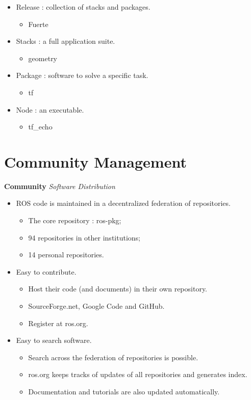 \documentclass[a4paper, 10pt, conference]{ieeeconf}       %
\begin{document}
\begin{itemize}
  \item Release : collection of stacks and packages.
  \begin{itemize}
    \item Fuerte
  \end{itemize}
  \item Stacks : a full application suite.
  \begin{itemize}
    \item geometry
  \end{itemize}
  \item Package : software to solve a specific task.
  \begin{itemize}
    \item tf
  \end{itemize}
  \item Node : an executable.
  \begin{itemize}
    \item tf\_echo
  \end{itemize}
\end{itemize}



\section{Community Management}

\textbf{Community}
\textit{Software Distribution}

\begin{itemize}
  \item ROS code is maintained in a decentralized federation of repositories.
  \begin{itemize}
    \item The core repository : ros-pkg;
    \item 94 repositories in other institutions;
    \item 14 personal repositories.
  \end{itemize}
  \item Easy to contribute.
  \begin{itemize}
    \item Host their code (and documents) in their own repository.
    \item SourceForge.net, Google Code and GitHub.
    \item Register at ros.org.
  \end{itemize}
  \item Easy to search software.
  \begin{itemize}
    \item Search across the federation of repositories is possible.
    \item ros.org keeps tracks of updates of all repositories and generates index.
    \item Documentation and tutorials are also updated automatically.
  \end{itemize}
\end{itemize}
\end{document}
